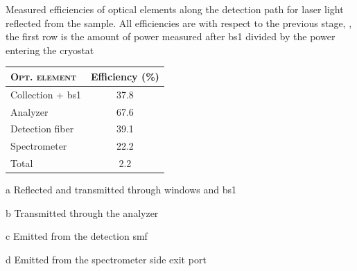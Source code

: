 \begin{margintable}[*-3]
    \centering
    \footnotesize
    \begin{threeparttable}
        \caption{
            Measured efficiencies of optical elements along the detection path for laser light reflected from the sample.
            All efficiencies are with respect to the previous stage, \ie, the first row is the amount of power measured after \gls{bs}1 divided by the power entering the cryostat
        }
        \label{tab:setup:optics:efficiency:measured}
        \begin{tabularx}{\marginparwidth}{lS}
            \toprule
            \textsc{Opt. element}                   & {Efficiency (\unit{\percent})} \\
            \midrule
            Collection + \acrshort{bs}1    & 37.8 \\
            Analyzer                       & 67.6 \\
            Detection fiber                & 39.1 \\
            Spectrometer                   & 22.2 \\
            \midrule
            Total                                   & 2.2 \\
            \bottomrule
        \end{tabularx}
        \begin{tablenotes}
            \scriptsize
            \item[a] Reflected and transmitted through windows and \acrshort{bs}1
            \item[b] Transmitted through the analyzer
            \item[c] Emitted from the detection \acrshort{smf}
            \item[d] Emitted from the spectrometer side exit port
        \end{tablenotes}
    \end{threeparttable}
\end{margintable}

